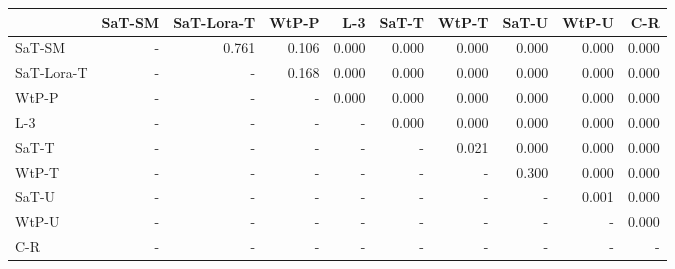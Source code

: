 \begin{tabular}{lrrrrrrrrr}
\toprule
 & SaT-SM & SaT-Lora-T & WtP-P & L-3 & SaT-T & WtP-T & SaT-U & WtP-U & C-R \\
\midrule
SaT-SM & - & 0.761 & 0.106 & 0.000 & 0.000 & 0.000 & 0.000 & 0.000 & 0.000 \\
SaT-Lora-T & - & - & 0.168 & 0.000 & 0.000 & 0.000 & 0.000 & 0.000 & 0.000 \\
WtP-P & - & - & - & 0.000 & 0.000 & 0.000 & 0.000 & 0.000 & 0.000 \\
L-3 & - & - & - & - & 0.000 & 0.000 & 0.000 & 0.000 & 0.000 \\
SaT-T & - & - & - & - & - & 0.021 & 0.000 & 0.000 & 0.000 \\
WtP-T & - & - & - & - & - & - & 0.300 & 0.000 & 0.000 \\
SaT-U & - & - & - & - & - & - & - & 0.001 & 0.000 \\
WtP-U & - & - & - & - & - & - & - & - & 0.000 \\
C-R & - & - & - & - & - & - & - & - & - \\
\bottomrule
\end{tabular}

